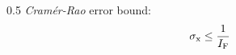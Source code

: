 \begin{frame}
\begin{columns}
\begin{column}{0.5\textwidth}
{            \textit{Cramér-Rao} error bound:
            \begin{equation*}
                \sigma_{\mathrm{x}}\le\frac{1}{I_{\mathrm{F}}}
            \end{equation*}
            }
        \end{column}
    \end{columns}

\end{frame}

